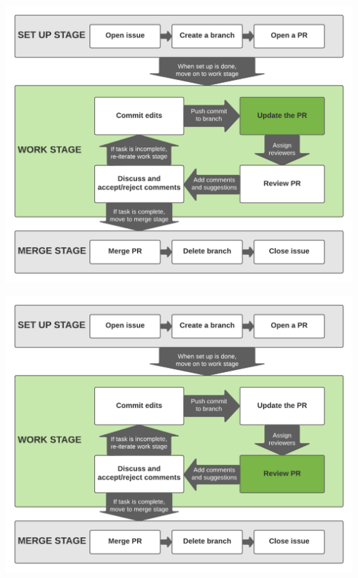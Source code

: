 \documentclass[aspectratio=169]{beamer} %
\begin{document}
\begin{frame}
	\includegraphics[width=\textwidth]{./img/branch-pr-merge-cycle-S2-2.png}
\end{frame}

\begin{frame}
	\includegraphics[width=\textwidth]{./img/branch-pr-merge-cycle-S2-3.png}
\end{frame}
\end{document}
